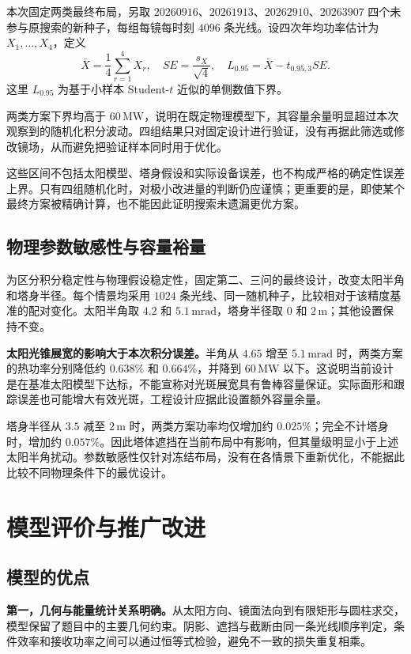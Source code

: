 本次固定两类最终布局，另取 $20260916$、$20261913$、$20262910$、$20263907$ 四个未参与原搜索的新种子，每组每镜每时刻 $4096$ 条光线。设四次年均功率估计为 $X_1,\ldots,X_4$，定义
\begin{equation}
\bar X=\frac14\sum_{r=1}^4X_r,\quad
SE=\frac{s_X}{\sqrt4},\quad
L_{0.95}=\bar X-t_{0.95,3}SE.
\end{equation}
这里 $L_{0.95}$ 为基于小样本 Student-$t$ 近似的单侧数值下界。

两类方案下界均高于 $60\,\mathrm{MW}$，说明在既定物理模型下，其容量余量明显超过本次观察到的随机化积分波动。四组结果只对固定设计进行验证，没有再据此筛选或修改镜场，从而避免把验证样本同时用于优化。

这些区间不包括太阳模型、塔身假设和实际设备误差，也不构成严格的确定性误差上界。只有四组随机化时，对极小改进量的判断仍应谨慎；更重要的是，即使某个最终方案被精确计算，也不能因此证明搜索未遗漏更优方案。

\pagepart
\subsection{物理参数敏感性与容量裕量}
为区分积分稳定性与物理假设稳定性，固定第二、三问的最终设计，改变太阳半角和塔身半径。每个情景均采用 $1024$ 条光线、同一随机种子，比较相对于该精度基准的配对变化。太阳半角取 $4.2$ 和 $5.1\,\mathrm{mrad}$，塔身半径取 $0$ 和 $2\,\mathrm m$；其他设置保持不变。

\textbf{太阳光锥展宽的影响大于本次积分误差。}半角从 $4.65$ 增至 $5.1\,\mathrm{mrad}$ 时，两类方案的热功率分别降低约 $0.638\%$ 和 $0.664\%$，并降到 $60\,\mathrm{MW}$ 以下。这说明当前设计是在基准太阳模型下达标，不能宣称对光斑展宽具有鲁棒容量保证。实际面形和跟踪误差也可能增大有效光斑，工程设计应据此设置额外容量余量。

塔身半径从 $3.5$ 减至 $2\,\mathrm m$ 时，两类方案功率均仅增加约 $0.025\%$；完全不计塔身时，增加约 $0.057\%$。因此塔体遮挡在当前布局中有影响，但其量级明显小于上述太阳半角扰动。参数敏感性仅针对冻结布局，没有在各情景下重新优化，不能据此比较不同物理条件下的最优设计。

\pagepart
\section{模型评价与推广改进}
\subsection{模型的优点}
\textbf{第一，几何与能量统计关系明确。}从太阳方向、镜面法向到有限矩形与圆柱求交，模型保留了题目中的主要几何约束。阴影、遮挡与截断由同一条光线顺序判定，条件效率和接收功率之间可以通过恒等式检验，避免不一致的损失重复相乘。

